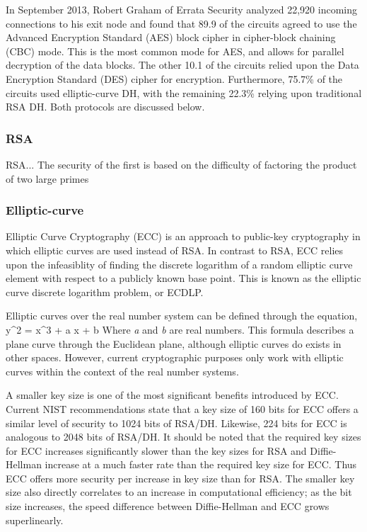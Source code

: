 \documentclass[journal]{IEEEtran}
\begin{document}
In September 2013, Robert Graham of Errata Security analyzed 22,920 incoming connections to his exit node and found that 89.9\; of the circuits agreed to use the Advanced Encryption Standard (AES) block cipher in cipher-block chaining (CBC) mode. This is the most common mode for AES, and allows for parallel decryption of the data blocks. The other 10.1\; of the circuits relied upon the Data Encryption Standard (DES) cipher for encryption. Furthermore, 75.7\% of the circuits used elliptic-curve DH, with the remaining 22.3\% relying upon traditional RSA DH.\cite{Graham2013} Both protocols are discussed below.

\subsubsection{RSA}

RSA...
The security of the first is based on the difficulty of factoring the product of two large primes

\subsubsection{Elliptic-curve}

Elliptic Curve Cryptography (ECC) is an approach to public-key cryptography in which elliptic curves are used instead of RSA. In contrast to RSA, ECC relies upon the infeasiblity of finding the discrete logarithm of a random elliptic curve element with respect to a publicly known base point. This is known as the elliptic curve discrete logarithm problem, or ECDLP.

Elliptic curves over the real number system can be defined through the equation,
y^2\; =\; x^3\; +\; a x\; +\; b\;
Where \textit{a} and \textit{b} are real numbers. This formula describes a plane curve through the Euclidean plane, although elliptic curves do exists in other spaces. However, current cryptographic purposes only work with elliptic curves within the context of the real number systems.

A smaller key size is one of the most significant benefits introduced by ECC. Current NIST recommendations state that a key size of 160 bits for ECC offers a similar level of security to 1024 bits of RSA/DH. Likewise, 224 bits for ECC is analogous to 2048 bits of RSA/DH. It should be noted that the required key sizes for ECC increases significantly slower than the key sizes for RSA and Diffie-Hellman increase at a much faster rate than the required key size for ECC. Thus ECC offers more security per increase in key size than for RSA. The smaller key size also directly correlates to an increase in computational efficiency; as the bit size increases, the speed difference between Diffie-Hellman and ECC grows superlinearly.\cite{CaseForECC}
\end{document}
